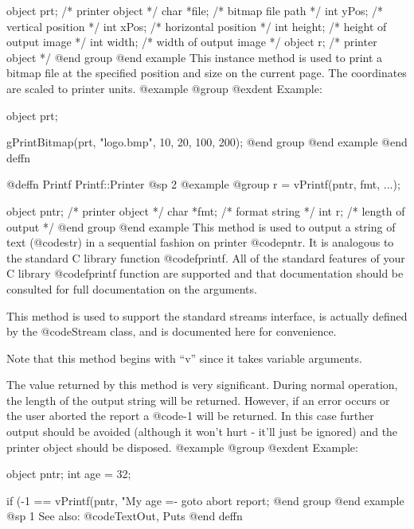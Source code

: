 object  prt;     /*  printer object          */
char    *file;   /*  bitmap file path        */
int     yPos;    /*  vertical position       */
int     xPos;    /*  horizontal position     */
int     height;  /*  height of output image  */
int     width;   /*  width of output image   */
object  r;       /*  printer object          */
@end group
@end example
This instance method is used to print a bitmap file at the specified
position and size on the current page.  The coordinates are scaled to
printer units.
@example
@group
@exdent Example:

object  prt;

gPrintBitmap(prt, "logo.bmp", 10, 20, 100, 200);
@end group
@end example
@end deffn
















@deffn {Printf} Printf::Printer
@sp 2
@example
@group
r = vPrintf(pntr, fmt, ...);

object   pntr;  /*  printer object     */
char    *fmt;   /*  format string      */
int      r;     /*  length of output   */
@end group
@end example
This method is used to output a string of text (@code{str}) in a sequential
fashion on printer @code{pntr}.  It is analogous to the standard C library
function @code{fprintf}.  All of the standard features of your C library
@code{fprintf} function are supported and that documentation should be
consulted for full documentation on the arguments.

This method is used to support the standard streams interface, is
actually defined by the @code{Stream} class, and is documented here for
convenience.

Note that this method begins with ``v'' since it takes variable arguments.

The value returned by this method is very significant.  During normal
operation, the length of the output string will be returned.  However,
if an error occurs or the user aborted the report a @code{-1} will be
returned.  In this case further output should be avoided (although it
won't hurt - it'll just be ignored) and the printer object should be
disposed.
@example
@group
@exdent Example:

object  pntr;
int     age = 32;

if (-1 == vPrintf(pntr, "My age =- %
        goto abort report;
@end group
@end example
@sp 1
See also:  @code{TextOut, Puts}
@end deffn














